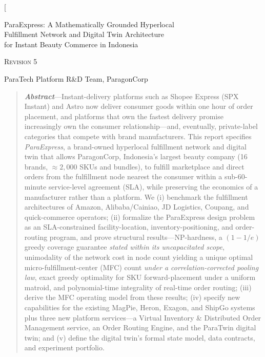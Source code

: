 \documentclass[10pt,twocolumn,letterpaper]{article}
\theoremstyle{definition}
\begin{document}
\twocolumn[
\begin{@twocolumnfalse}
\vspace*{-8pt}
\begin{center}
{\LARGE ParaExpress: A Mathematically Grounded Hyperlocal\\[2pt]
Fulfillment Network and Digital Twin Architecture\\[2pt]
for Instant Beauty Commerce in Indonesia\par}
\vspace{6pt}
{\large\textsc{Revision 5}\par}
\vspace{8pt}
{\normalsize ParaTech Platform R\&D Team, ParagonCorp\par}
\vspace{10pt}
\end{center}
\begin{quotation}\noindent\footnotesize
\textbf{\textit{Abstract}}---Instant-delivery platforms such as Shopee Express (SPX Instant) and Astro now deliver consumer goods within one hour of order placement, and platforms that own the fastest delivery promise increasingly own the consumer relationship---and, eventually, private-label categories that compete with brand manufacturers. This report specifies \emph{ParaExpress}, a brand-owned hyperlocal fulfillment network and digital twin that allows ParagonCorp, Indonesia's largest beauty company (16 brands, ${\approx}2{,}000$ SKUs and bundles), to fulfill marketplace and direct orders from the fulfillment node nearest the consumer within a sub-60-minute service-level agreement (SLA), while preserving the economics of a manufacturer rather than a platform. We (i) benchmark the fulfillment architectures of Amazon, Alibaba/Cainiao, JD Logistics, Coupang, and quick-commerce operators; (ii) formalize the ParaExpress design problem as an SLA-constrained facility-location, inventory-positioning, and order-routing program, and prove structural results---NP-hardness, a $(1-1/e)$ greedy coverage guarantee \emph{stated within its uncapacitated scope}, unimodality of the network cost in node count yielding a unique optimal micro-fulfillment-center (MFC) count \emph{under a correlation-corrected pooling law}, exact greedy optimality for SKU forward-placement under a uniform matroid, and polynomial-time integrality of real-time order routing; (iii) derive the MFC operating model from these results; (iv) specify new capabilities for the existing MagPie, Heron, Exagon, and ShipGo systems plus three new platform services---a Virtual Inventory \& Distributed Order Management service, an Order Routing Engine, and the ParaTwin digital twin; and (v) define the digital twin's formal state model, data contracts, and experiment portfolio.


\end{quotation}
\end{@twocolumnfalse}
\end{document}
